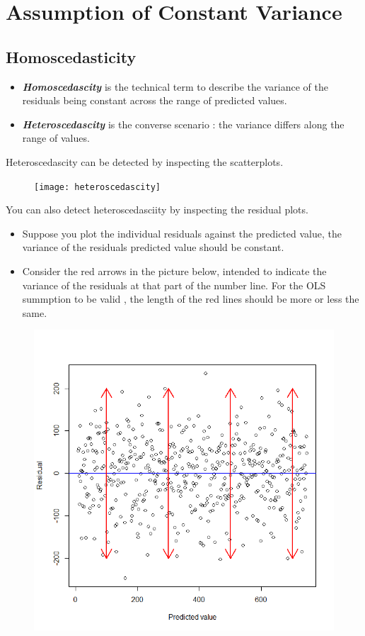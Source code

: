 \documentclass[residuals.tex]{subfiles}
\begin{document}
\Large
\section*{Assumption of Constant Variance}
\subsection*{Homoscedasticity}
\begin{itemize}
\item \textbf{\textit{Homoscedascity}} is the technical term to describe the variance of the residuals being constant across the range of predicted values. 

\item \textbf{\textit{Heteroscedascity}} is the converse scenario : the variance differs along the range of values.
\end{itemize}
Heteroscedascity can be detected by inspecting the scatterplots.
\begin{figure}[h!]
	\centering
	\texttt{[image: heteroscedascity]}

\end{figure}

You can also detect heteroscedasciity by inspecting the residual plots.

\begin{itemize}
\item Suppose you plot the individual residuals against the predicted value, the variance of the residuals predicted value should be constant. 
\item  Consider the red arrows in the picture below, intended to indicate the variance of the residuals at that part of the number line. For the OLS summption to be valid , the length of the red lines should be more or less the same.
\end{itemize}


\begin{figure}[h!]
\centering
\includegraphics[width=0.4\linewidth]{homosked}
\caption{}
\label{fig:homosked}
\end{figure}
\end{document}

